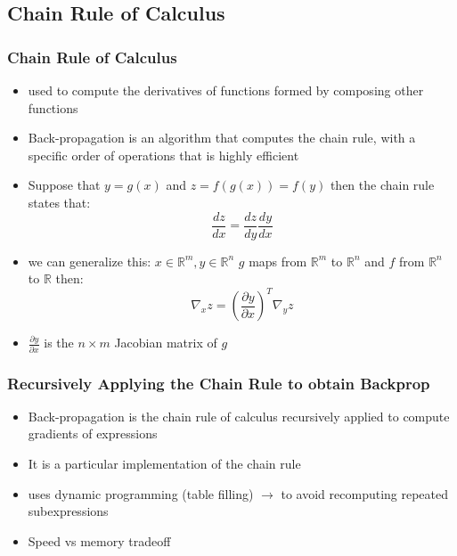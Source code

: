 \documentclass{beamer}
\begin{document}
\subsection{Chain Rule of Calculus}
\begin{frame}
	\frametitle{Chain Rule of Calculus}
\begin{itemize}
	\item used to compute the derivatives of functions formed by composing other functions
		\pause
	\item Back-propagation is an algorithm that computes the chain rule, with a speciﬁc order of operations that is highly eﬃcient
		\pause
	\item Suppose that $y = g(x)$ and $z= f(g(x)) = f(y)$ then the chain rule states that: 
		$$ \frac{dz}{dx} = \frac{dz}{dy} \frac{dy}{dx}$$
		\pause
	\item we can generalize this: $ x \in \mathbb{R}^m , y \in \mathbb{R}^n$ $g$ maps from $\mathbb{R}^m$ to $\mathbb{R}^n$ and $f$ from $\mathbb{R}^n$ to $\mathbb{R}$ then: 
		$$\nabla_{x}z = (\frac{\partial y}{\partial x})^T \nabla_{y}z $$
	\item $\frac{\partial y}{\partial x}$ is the $n \times m$ Jacobian matrix of $g$
\end{itemize}	
\end{frame}
\begin{frame}
	\frametitle{Recursively Applying the Chain Rule to obtain Backprop}
	\begin{itemize}
		\item Back-propagation is the chain rule of calculus recursively applied to compute gradients of expressions 
		\item It is a particular implementation of the chain rule
			\pause
		\item uses dynamic programming (table filling) $\rightarrow$ to avoid recomputing repeated subexpressions
		\item Speed vs memory tradeoff
		
	\end{itemize}	
\end{frame}
\end{document}
